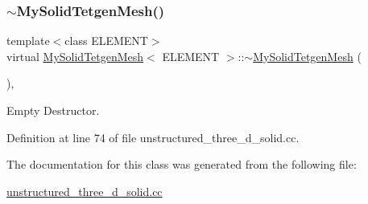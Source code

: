 \mbox{\label{classMySolidTetgenMesh_ad0e9bf1679a2ba8d3d655b95d7124e91}} 
\subsubsection{\texorpdfstring{$\sim$\+My\+Solid\+Tetgen\+Mesh()}{~MySolidTetgenMesh()}}
{\footnotesize\ttfamily template$<$class E\+L\+E\+M\+E\+NT$>$ \\
virtual \hyperlink{classMySolidTetgenMesh}{My\+Solid\+Tetgen\+Mesh}$<$ E\+L\+E\+M\+E\+NT $>$\+::$\sim$\hyperlink{classMySolidTetgenMesh}{My\+Solid\+Tetgen\+Mesh} (\begin{DoxyParamCaption}{ }\end{DoxyParamCaption})\hspace{0.3cm}{\ttfamily [inline]}, {\ttfamily [virtual]}}



Empty Destructor. 



Definition at line 74 of file unstructured\+\_\+three\+\_\+d\+\_\+solid.\+cc.



The documentation for this class was generated from the following file\+:\begin{DoxyCompactItemize}
\item 
\hyperlink{unstructured__three__d__solid_8cc}{unstructured\+\_\+three\+\_\+d\+\_\+solid.\+cc}\end{DoxyCompactItemize}
